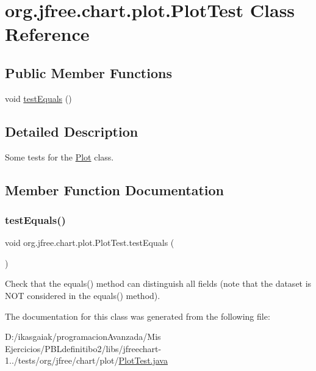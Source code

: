 \hypertarget{classorg_1_1jfree_1_1chart_1_1plot_1_1_plot_test}{}\section{org.\+jfree.\+chart.\+plot.\+Plot\+Test Class Reference}
\label{classorg_1_1jfree_1_1chart_1_1plot_1_1_plot_test}
\subsection*{Public Member Functions}
\begin{DoxyCompactItemize}
\item 
void \mbox{\hyperlink{classorg_1_1jfree_1_1chart_1_1plot_1_1_plot_test_acc40cc6f8d1b7490f75424df6030c7a1}{test\+Equals}} ()
\end{DoxyCompactItemize}


\subsection{Detailed Description}
Some tests for the \mbox{\hyperlink{classorg_1_1jfree_1_1chart_1_1plot_1_1_plot}{Plot}} class. 

\subsection{Member Function Documentation}
\mbox{\label{classorg_1_1jfree_1_1chart_1_1plot_1_1_plot_test_acc40cc6f8d1b7490f75424df6030c7a1}} 
\subsubsection{\texorpdfstring{test\+Equals()}{testEquals()}}
{\footnotesize\ttfamily void org.\+jfree.\+chart.\+plot.\+Plot\+Test.\+test\+Equals (\begin{DoxyParamCaption}{ }\end{DoxyParamCaption})}

Check that the equals() method can distinguish all fields (note that the dataset is N\+OT considered in the equals() method). 

The documentation for this class was generated from the following file\+:\begin{DoxyCompactItemize}
\item 
D\+:/ikasgaiak/programacion\+Avanzada/\+Mis Ejercicios/\+P\+B\+Ldefinitibo2/libs/jfreechart-\/1../tests/org/jfree/chart/plot/\mbox{\hyperlink{_plot_test_8java}{Plot\+Test.\+java}}\end{DoxyCompactItemize}
